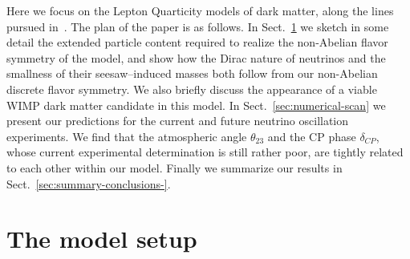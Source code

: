 \documentclass[english,10pt,aps,prd,a4paper,preprintnumbers,floatfix,nofootinbib,showpacs,superscriptaddress]{revtex4-1}
\begin{document}
Here we focus on the Lepton Quarticity models of dark matter, along
the lines pursued in~\cite{ Chulia:2016ngi,Chulia:2016giq}.
%
The plan of the paper is as follows.  In Sect.~\ref{sec:model} we
sketch in some detail the extended particle content required to
realize the non-Abelian flavor symmetry of the model, and show how the
Dirac nature of neutrinos and the smallness of their seesaw--induced
masses both follow from our non-Abelian discrete flavor symmetry. We
also briefly discuss the appearance of a viable WIMP dark matter
candidate in this model.
In Sect.~\ref{sec:numerical-scan} we present our predictions for the
current and future neutrino oscillation experiments.
%
We find that the atmospheric angle $\theta_{23}$ and the CP phase
$\delta_{CP}$, whose current experimental determination is still
rather poor, are tightly related to each other within our model.
Finally we summarize our results in
Sect.~\ref{sec:summary-conclusions-}.


 \section{The model setup }
\label{sec:model}

\end{document}
